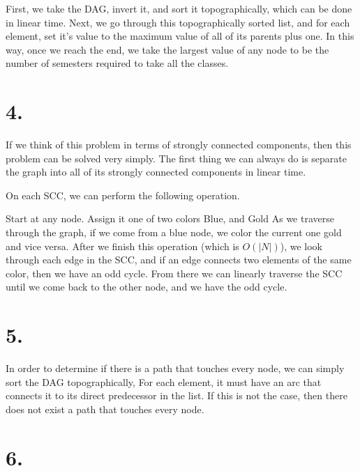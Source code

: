\documentclass[11pt]{article}
\begin{document}
First, we take the DAG, invert it, and sort it topographically, which can be
done in linear time. Next, we go through this topographically sorted list, and
for each element, set it's value to the maximum value of all of its parents plus
one. In this way, once we reach the end, we take the largest value of any node
to be the number of semesters required to take all the classes. 

\newpage
\section*{4.}
If we think of this problem in terms of strongly connected components, then this
problem can be solved very simply. The first thing we can always do is separate
the graph into all of its strongly connected components in linear time. 

On each SCC, we can perform the following operation. 

Start at any node. Assign it one of two colors Blue, and Gold
As we traverse through the graph, if we come from a blue node, we color the
current one gold and vice versa. After we finish this operation (which is
$O(|N|)$), we look through each edge in the SCC, and if an edge connects two
elements of the same color, then we have an odd cycle. From there we can
linearly traverse the SCC until we come back to the other node, and we have the
odd cycle. 
\newpage
\section*{5.}
In order to determine if there is a path that touches every node, we can simply
sort the DAG topographically, For each element, it must have an arc that
connects it to its direct predecessor in the list. If this is not the case, then
there does not exist a path that touches every node. 
\newpage

\section*{6.}
\end{document}
